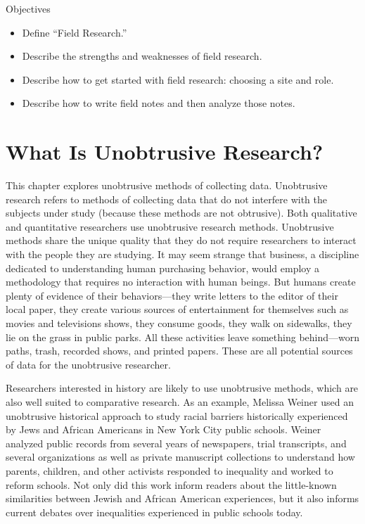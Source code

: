 \begin{center}
	\begin{objbox}{Objectives}
		\begin{itemize}
			\setlength{\itemsep}{0pt}
			\setlength{\parskip}{0pt}
			\setlength{\parsep}{0pt}
			
			\item Define ``Field Research.''
			\item Describe the strengths and weaknesses of field research.
			\item Describe how to get started with field research: choosing a site and role.
			\item Describe how to write field notes and then analyze those notes.
		\end{itemize}
	\end{objbox}
\end{center}

\section{What Is Unobtrusive Research?}

This chapter explores unobtrusive methods of collecting data. Unobtrusive research refers to methods of collecting data that do not interfere with the subjects under study (because these methods are not obtrusive). Both qualitative and quantitative researchers use unobtrusive research methods. Unobtrusive methods share the unique quality that they do not require researchers to interact with the people they are studying. It may seem strange that business, a discipline dedicated to understanding human purchasing behavior, would employ a methodology that requires no interaction with human beings. But humans create plenty of evidence of their behaviors---they write letters to the editor of their local paper, they create various sources of entertainment for themselves such as movies and televisions shows, they consume goods, they walk on sidewalks, they lie on the grass in public parks. All these activities leave something behind---worn paths, trash, recorded shows, and printed papers. These are all potential sources of data for the unobtrusive researcher.

Researchers interested in history are likely to use unobtrusive methods, which are also well suited to comparative research. As an example, Melissa Weiner \cite{weiner2010power} used an unobtrusive historical approach to study racial barriers historically experienced by Jews and African Americans in New York City public schools. Weiner analyzed public records from several years of newspapers, trial transcripts, and several organizations as well as private manuscript collections to understand how parents, children, and other activists responded to inequality and worked to reform schools. Not only did this work inform readers about the little-known similarities between Jewish and African American experiences, but it also informs current debates over inequalities experienced in public schools today.

